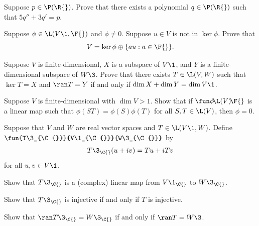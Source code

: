 \exercise
Suppose $p \in \P(\R{})$. Prove that there exists a polynomial $q \in \P(\R{})$ such that $5 q'' + 3 q' = p$.


\exercise
Suppose $\phi \in \L(V\1, \F{})$ and $\phi \ne 0$. Suppose $u \in V$ is not in $\ker \phi$. Prove that
\[
V = \ker \phi \oplus \{au: a \in \F{}\}.
\]
\exercisedisplayend


\exercise
Suppose $V$ is finite-dimensional, $X$ is a subspace of $V\1$, and $Y$ is a finite-dimensional subspace of $W\3$. Prove that there exists $T \in \L(V, W)$ such that $\ker T = X$ and $\ran T = Y$ if and only if
$\dim X + \dim Y = \dim V\1$.


\exercise
Suppose $V$ is finite-dimensional with $\dim V > 1$. Show that if \mbox{$\fun \phi {\!\L(V)\!} {\F{}}$} is a linear map such that
$
\phi(ST) = \phi(S) \phi(T)
$
for all $S, T \in \L(V)$, then $\phi = 0$.


\exercise
Suppose that $V$ and $W$ are real vector spaces and $T \in \L(V\1, W)$. Define $\fun {T\3_{\C{}}} {V\1_{\C{}}} {W\3_{\C{}}}$ by\label{3complexMap}
\[
T\3_{\C{}}(u + iv) = Tu + iTv
\]
for all $u, v \in V\1$.
\begin{subtheorem}
\item
Show that $T\3_{\C{}}$ is a (complex) linear map from $V\1_{\C{}}$ to $W\3_{\C{}}$.
\item
Show that $T\3_{\C{}}$ is injective if and only if $T$ is injective.
\item
Show that $\ran T\3_{\C{}} = W\3_{\C{}}$ if and only if $\ran T = W\3$.
\end{subtheorem}


